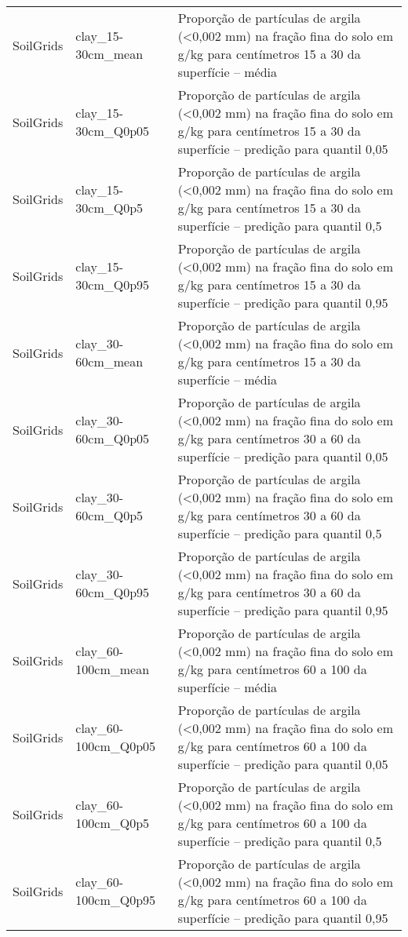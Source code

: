 \begin{longtable}{@{} p{4cm} p{4cm} p{8cm} @{}}
	SoilGrids &
	clay\_15-30cm\_mean &
	Proporção de partículas de argila (\textless 0,002 mm) na fração fina do solo em g/kg para centímetros 15 a 30 da superfície – média \\
	SoilGrids &
	clay\_15-30cm\_Q0p05 &
	Proporção de partículas de argila (\textless 0,002 mm) na fração fina do solo em g/kg para centímetros 15 a 30 da superfície – predição para quantil 0,05 \\
	SoilGrids &
	clay\_15-30cm\_Q0p5 &
	Proporção de partículas de argila (\textless 0,002 mm) na fração fina do solo em g/kg para centímetros 15 a 30 da superfície – predição para quantil 0,5 \\
	SoilGrids &
	clay\_15-30cm\_Q0p95 &
	Proporção de partículas de argila (\textless 0,002 mm) na fração fina do solo em g/kg para centímetros 15 a 30 da superfície – predição para quantil 0,95 \\
	SoilGrids &
	clay\_30-60cm\_mean &
	Proporção de partículas de argila (\textless 0,002 mm) na fração fina do solo em g/kg para centímetros 15 a 30 da superfície – média \\
	SoilGrids &
	clay\_30-60cm\_Q0p05 &
	Proporção de partículas de argila (\textless 0,002 mm) na fração fina do solo em g/kg para centímetros 30 a 60 da superfície – predição para quantil 0,05 \\
	SoilGrids &
	clay\_30-60cm\_Q0p5 &
	Proporção de partículas de argila (\textless 0,002 mm) na fração fina do solo em g/kg para centímetros 30 a 60 da superfície – predição para quantil 0,5 \\
	SoilGrids &
	clay\_30-60cm\_Q0p95 &
	Proporção de partículas de argila (\textless 0,002 mm) na fração fina do solo em g/kg para centímetros 30 a 60 da superfície – predição para quantil 0,95 \\
	SoilGrids &
	clay\_60-100cm\_mean &
	Proporção de partículas de argila (\textless 0,002 mm) na fração fina do solo em g/kg para centímetros 60 a 100 da superfície – média \\
	SoilGrids &
	clay\_60-100cm\_Q0p05 &
	Proporção de partículas de argila (\textless 0,002 mm) na fração fina do solo em g/kg para centímetros 60 a 100 da superfície – predição para quantil 0,05 \\
	SoilGrids &
	clay\_60-100cm\_Q0p5 &
	Proporção de partículas de argila (\textless 0,002 mm) na fração fina do solo em g/kg para centímetros 60 a 100 da superfície – predição para quantil 0,5 \\
	SoilGrids &
	clay\_60-100cm\_Q0p95 &
	Proporção de partículas de argila (\textless 0,002 mm) na fração fina do solo em g/kg para centímetros 60 a 100 da superfície – predição para quantil 0,95 \\

\end{longtable}
